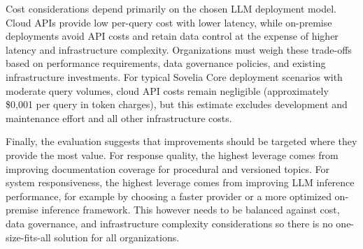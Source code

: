 Cost considerations depend primarily on the chosen LLM deployment model. Cloud APIs provide low per-query cost with lower latency, while on-premise deployments avoid API costs and retain data control at the expense of higher latency and infrastructure complexity. Organizations must weigh these trade-offs based on performance requirements, data governance policies, and existing infrastructure investments. For typical Sovelia Core deployment scenarios with moderate query volumes, cloud API costs remain negligible (approximately \$0,001 per query in token charges), but this estimate excludes development and maintenance effort and all other infrastructure costs.

Finally, the evaluation suggests that improvements should be targeted where they provide the most value. For response quality, the highest leverage comes from improving documentation coverage for procedural and versioned topics. For system responsiveness, the highest leverage comes from improving LLM inference performance, for example by choosing a faster provider or a more optimized on-premise inference framework. This however needs to be balanced against cost, data governance, and infrastructure complexity considerations so there is no one-size-fits-all solution for all organizations.
